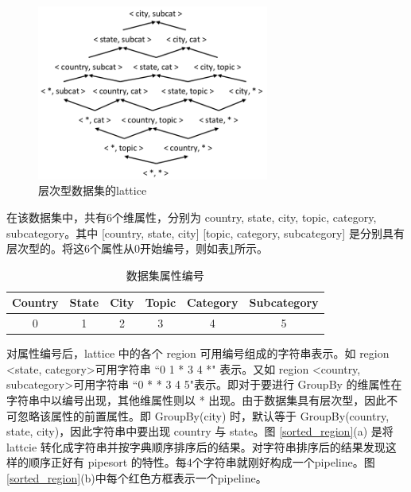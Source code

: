 \begin{figure}[!htb]
\centering\includegraphics[width=3in]{picture/ch_datacube_mr/dataset_lattice} 
\caption{层次型数据集的lattice}\label{dataset_lattice1} 
\end{figure} 

在该数据集中，共有6个维属性，分别为 country, state, city, topic, category, subcategory。其中 [country, state, city] [topic, category, subcategory] 是分别具有层次型的。将这6个属性从0开始编号，则如表\ref{attribute_no}所示。

\begin{table}[!ht]
\begin{center}
\begin{tabular}{|c|c|c|c|c|c|}
\hline 
Country & State & City & Topic & Category & Subcategory \\ 
\hline 
0 & 1 & 2 & 3 & 4 & 5 \\ 
\hline 
\end{tabular} 
\end{center}
\caption{数据集属性编号}\label{attribute_no}
\end{table}

对属性编号后，lattice 中的各个 region 可用编号组成的字符串表示。如 region \textless state, category\textgreater 可用字符串 ``0 1 * 3 4 *" 表示。又如 region \textless country, subcategory\textgreater 可用字符串 ``0 * * 3 4 5"表示。即对于要进行 GroupBy 的维属性在字符串中以编号出现，其他维属性则以 * 出现。由于数据集具有层次型，因此不可忽略该属性的前置属性。即 GroupBy(city) 时，默认等于 GroupBy(country, state, city)，因此字符串中要出现 country 与 state。图 \ref{sorted_region}(a) 是将 lattcie 转化成字符串并按字典顺序排序后的结果。对字符串排序后的结果发现这样的顺序正好有 pipesort 的特性。每4个字符串就刚好构成一个pipeline。图\ref{sorted_region}(b)中每个红色方框表示一个pipeline。

